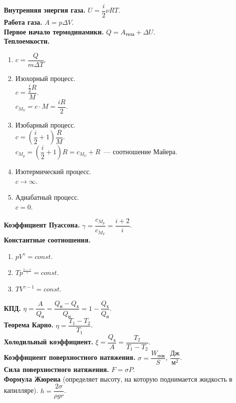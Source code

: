 \documentclass[12pt]{article}
\begin{document}
	\textbf{Внутренняя энергия газа.} $U = \dfrac{i}{2} \nu R T$.\\
	\textbf{Работа газа.} $A = p \varDelta V$.\\
	\textbf{Первое начало термодинамики.} $Q = A_{\text{тела}} + \varDelta U$.\\
	\textbf{Теплоемкости.}
	\begin{enumerate}
		\item $c = \dfrac{Q}{m \varDelta T}$.
		\item Изохорный процесс.\\
		$c = \dfrac{\frac{i}{2} R}{M}$.\\
		$c_{M_V} = c \cdot M = \dfrac{iR}{2}.$
		\item Изобарный процесс.\\
		$c = \left( \dfrac{i}{2} + 1 \right) \dfrac{R}{M}$.\\
		$c_{M_p} = \left( \dfrac{i}{2} + 1 \right) R = c_{M_V} + R$~--- соотношение Майера.
		\item Изотермический процесс.\\
		$c \rightarrow \infty$.
		\item Адиабатный процесс.\\
		$c = 0$.
	\end{enumerate}
	\textbf{Коэффициент Пуассона.} $\gamma = \dfrac{c_{M_p}}{c_{M_V}} = \dfrac{i + 2}{i}$.\\
	\textbf{Константные соотношения.}
	\begin{enumerate}
		\item $pV^\gamma = const$.
		\item $Tp^{\frac{1 - \gamma}{\gamma}} = const$.
		\item $TV^{\gamma - 1} = const$.
	\end{enumerate}
	\textbf{КПД.} $\eta = \dfrac{A}{Q_{\text{н}}} = \dfrac{Q_{\text{н}} - Q_{\text{х}}}{Q_{\text{н}}} = 1 - \dfrac{Q_{\text{х}}}{Q_{\text{н}}}$.\\
	\textbf{Теорема Карно.} $\eta = \dfrac{T_1 - T_2}{T_1}$.\\
	\textbf{Холодильный коэффициент.} $\xi = \dfrac{Q_{\text{х}}}{A} = \dfrac{T_2}{T_1 - T_2}$.\\
	\textbf{Коэффициент поверхностного натяжения.} $\sigma = \dfrac{W_{\text{пов}}}{S}$, $\dfrac{\text{Дж}}{\text{м}^2}$.\\
	\textbf{Сила поверхностного натяжения.} $F = \sigma P$.\\
	\textbf{Формула Жюрена} (определяет высоту, на которую поднимается жидкость в капилляре). $h = \dfrac{2 \sigma}{\rho g r}$.\\
\end{document}
